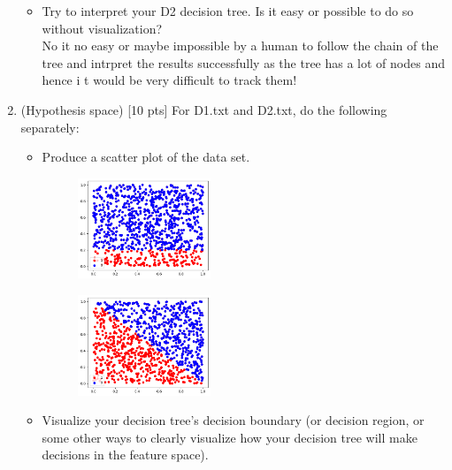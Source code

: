 \documentclass[a4paper]{article}
\theoremstyle{definition}
\begin{document}
\begin{enumerate}
\begin{itemize}
  \item Try to interpret your D2 decision tree. Is it easy or possible to do so without visualization? \\
  No it no easy or maybe impossible by a human to follow the chain of the tree and intrpret the results successfully as the tree has a lot of nodes and hence i t would be very difficult to track them!
  \end{itemize}

\item (Hypothesis space)  [10 pts] For D1.txt and D2.txt, do the following separately:
  \begin{itemize}
  
  \item Produce a scatter plot of the data set.
  
  \begin{figure}[H]
  	\centering
  	\includegraphics[width=0.4\textwidth]{q61.png}  
  	\captionsetup{labelformat=empty}
  	\caption{}
  	\label{fig:my_label}
  \end{figure}
  
  \begin{figure}[H]
  	\centering
  	\includegraphics[width=0.4\textwidth]{q62.png}  
  	\captionsetup{labelformat=empty}
  	\caption{}
  	\label{fig:my_label}
  \end{figure}

  \item Visualize your decision tree's decision boundary (or decision region, or some other ways to clearly visualize how your decision tree will make decisions in the feature space).


\end{itemize}
\end{enumerate}
\end{document}
